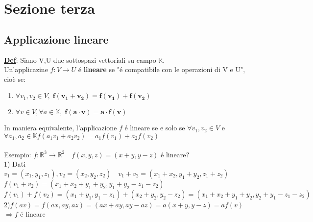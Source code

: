 \documentclass[12pt]{article}
\begin{document}
\section{Sezione terza}
\subsection{Applicazione lineare}
\textbf{\underline{Def}}: Siano V,U due sottospazi vettoriali su campo $\mathbb{K}$.\\
Un'applicazine $f:V\longrightarrow U$ é \textbf{lineare} se "é compatibile con le operazioni di V e U", cioè se:
\begin{enumerate}
    \item $\forall v_1,v_2 \in V, \;\boldsymbol{f(v_1+v_2)=f(v_1)+f(v_2)}$
    \item $\forall v \in V, \forall a\in \mathbb{K},\; \boldsymbol{f(a\cdot v)=a\cdot f(v)}$
\end{enumerate}
In maniera equivalente, l'applicazione $f$ é lineare se e solo se $\forall v_1,v_2 \in V$ e $\forall a_1,a_2 \in \mathbb{K} f(a_1v_1 + a_2v_2) = a_1f(v_1)+a_2f(v_2)$\\\\
Esempio: $f: \mathbb{R}^3 \longrightarrow \mathbb{R}^2\quad f(x,y,z)=(x+y,y-z)$ é lineare?\\
1) Dati $v_1 = (x_1,y_1,z_1), v_2=(x_2,y_2,z_2)\quad v_1+v_2 = (x_1+x_2,y_1+y_2,z_1+z_2)$\\
$f(v_1+v_2) = (x_1+x_2+y_1+y_2, y_1+y_2 - z_1 - z_2)$\\
$f(v_1) + f(v_2) = (x_1+y_1, y_1-z_1) + (x_2+y_2, y_2-z_2) = (x_1+x_2+y_1+y_2, y_2+y_1-z_1-z_2)$\\
2)$f(av) = f(ax,ay,az) = (ax+ay,ay-az) = a(x+y,y-z) = af(v)$\\$ \Longrightarrow f$ é lineare
\end{document}
